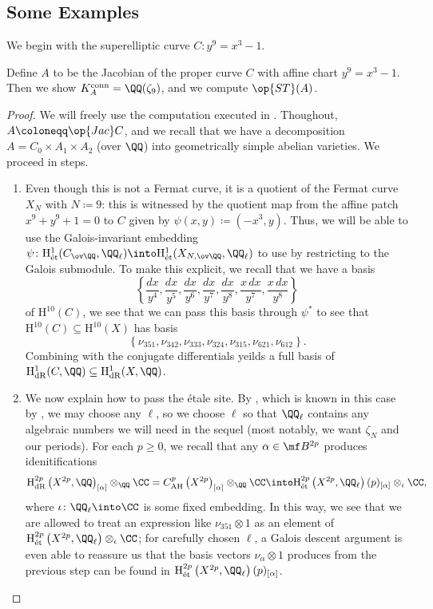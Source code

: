 \documentclass[../thesis.tex]{subfiles}
\begin{document}
\subsection{Some Examples}
We begin with the superelliptic curve $C\colon y^9=x^3-1$.
\begin{proposition} \label{prop:special-fermat-st-full}
	Define $A$ to be the Jacobian of the proper curve $C$ with affine chart $y^9=x^3-1$. Then we show $K^{\mathrm{conn}}_A=\QQ(\zeta_9)$, and we compute $\op{ST}(A)$.
\end{proposition}
\begin{proof}
	We will freely use the computation executed in . Thoughout, $A\coloneqq\op{Jac}C$, and we recall that we have a decomposition $A=C_0\times A_1\times A_2$ (over $\QQ$) into geometrically simple abelian varieties. We proceed in steps.
	\begin{enumerate}
		\item Even though this is not a Fermat curve, it is a quotient of the Fermat curve $X_N$ with $N\coloneqq9$: this is witnessed by the quotient map from the affine patch $x^9+y^9+1=0$ to $C$ given by $\psi(x,y)\coloneqq\left(-x^3,y\right)$. Thus, we will be able to use the Galois-invariant embedding $\psi\colon\mathrm H^1_{\mathrm{\acute et}}(C_{\ov\QQ},\QQ_\ell)\into\mathrm H^1_{\mathrm{\acute et}}(X_{N,\ov\QQ},\QQ_\ell)$ to use  by restricting to the Galois submodule. To make this explicit, we recall that we have a basis
		\[\left\{\frac{dx}{y^4},\frac{dx}{y^5},\frac{dx}{y^6},\frac{dx}{y^7},\frac{dx}{y^8},\frac{x\,dx}{y^7},\frac{x\,dx}{y^8}\right\}\]
		of $\mathrm H^{10}(C)$, we see that we can pass this basis through $\psi^*$ to see that $\mathrm H^{10}(C)\subseteq\mathrm H^{10}(X)$ has basis
		\[\left\{\nu_{351},\nu_{342},\nu_{333},\nu_{324},\nu_{315},\nu_{621},\nu_{612}\right\}.\]
		Combining with the conjugate differentials yeilds a full basis of $\mathrm H^1_{\mathrm{dR}}(C,\QQ)\subseteq\mathrm H^1_{\mathrm{dR}}(X,\QQ)$.

		\item We now explain how to pass the \'etale site. By , which is known in this case by , we may choose any $\ell$, so we choose $\ell$ so that $\QQ_\ell$ contains any algebraic numbers we will need in the sequel (most notably, we want $\zeta_N$ and our periods). For each $p\ge0$, we recall that any $\alpha\in\mf B^{2p}$ produces idenitifications
		\[\mathrm H^{2p}_{\mathrm{dR}}\left(X^{2p},\QQ\right)_{[\alpha]}\otimes_\QQ\CC=C^p_{\mathrm{AH}}\left(X^{2p}\right)_{[\alpha]}\otimes_\QQ\CC\into\mathrm H^{2p}_{\mathrm{\acute et}}\left(X^{2p},\QQ_\ell\right)(p)_{[\alpha]}\otimes_\iota\CC,\]
		where $\iota\colon\QQ_\ell\into\CC$ is some fixed embedding. In this way, we see that we are allowed to treat an expression like $\nu_{351}\otimes1$ as an element of $\mathrm H^{2p}_{\mathrm{\acute et}}\left(X^{2p},\QQ_\ell\right)\otimes_\iota\CC$; for carefully chosen $\ell$, a Galois descent argument is even able to reassure us that the basis vectors $\nu_\alpha\otimes1$ produces from the previous step can be found in $\mathrm H^{2p}_{\mathrm{\acute et}}\left(X^{2p},\QQ_\ell\right)(p)_{[\alpha]}$.


\end{enumerate}
\end{proof}
\end{document}
